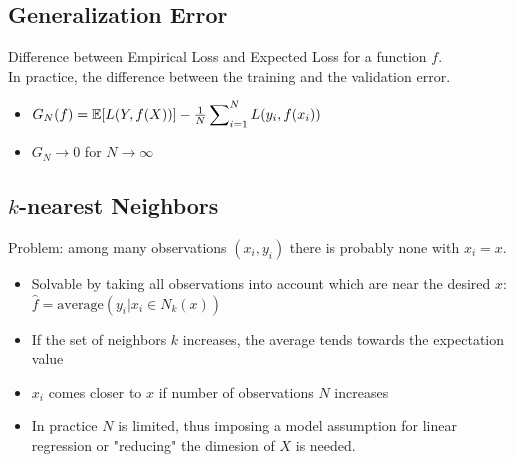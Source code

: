 \documentclass[english]{latex4ei/latex4ei_sheet}
\begin{document}
\begin{sectionbox}

\subsection{Generalization Error}
Difference between Empirical Loss and Expected Loss for a function $f$.\\In practice, the difference between the training and the validation error.
\begin{itemize}
    \item $G_N(f)=\mathbb{E}[L(Y,f(X))]-\frac{1}{N}\sideset{}{_{i=1}^N}\sum L(y_i,f(x_i))$
    \item $G_N \to 0$ for $N\to \infty$
\end{itemize}

\subsection{$k$-nearest Neighbors}
Problem: among many observations $(x_i,y_i)$ there is probably none with $x_i=x$.
\begin{itemize}
    \item Solvable by taking all observations into account which are near the desired $x$: $\hat{f}=\mathrm{average}(y_i|x_i \in N_k(x))$
    \item If the set of neighbors $k$ increases, the average tends towards the expectation value
    \item $x_i$ comes closer to $x$ if number of observations $N$ increases
    \item In practice $N$ is limited, thus imposing a model assumption for linear regression or "reducing" the dimesion of $X$ is needed.
\end{itemize}

\end{sectionbox}
\end{document}
